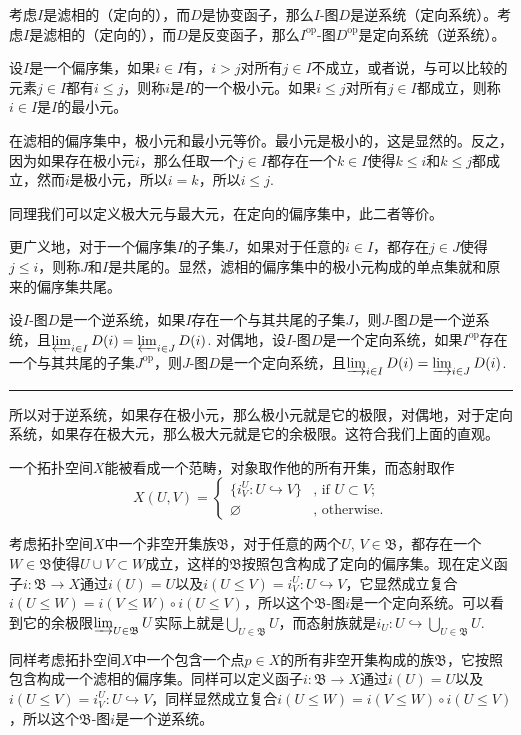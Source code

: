 \para 考虑$I$是滤相的（定向的），而$D$是协变函子，那么$I$-图$D$是逆系统（定向系统）。考虑$I$是滤相的（定向的），而$D$是反变函子，那么$I^{\mathrm{op}}$-图$D^{\mathrm{op}}$是定向系统（逆系统）。

\para 设$I$是一个偏序集，如果$i\in I$有，$i>j$对所有$j\in I$不成立，或者说，与可以比较的元素$j\in I$都有$i\leq j$，则称$i$是$I$的一个极小元。如果$i\leq j$对所有$j\in I$都成立，则称$i\in I$是$I$的最小元。

在滤相的偏序集中，极小元和最小元等价。最小元是极小的，这是显然的。反之，因为如果存在极小元$i$，那么任取一个$j\in I$都存在一个$k\in I$使得$k\leq i$和$k\leq j$都成立，然而$i$是极小元，所以$i=k$，所以$i\leq j$.

同理我们可以定义极大元与最大元，在定向的偏序集中，此二者等价。

更广义地，对于一个偏序集$I$的子集$J$，如果对于任意的$i\in I$，都存在$j\in J$使得$j\leq i$，则称$J$和$I$是共尾的。显然，滤相的偏序集中的极小元构成的单点集就和原来的偏序集共尾。

\pro 设$I$-图$D$是一个逆系统，如果$I$存在一个与其共尾的子集$J$，则$J$-图$D$是一个逆系统，且$\varprojlim_{i\in I} D(i)=\varprojlim_{i\in J} D(i)$. 对偶地，设$I$-图$D$是一个定向系统，如果$I^{\mathrm{op}} $存在一个与其共尾的子集$J^{\mathrm{op}} $，则$J$-图$D$是一个定向系统，且$\varinjlim_{i\in I} D(i)=\varinjlim_{i\in J} D(i)$. \rule{2mm}{2mm}

所以对于逆系统，如果存在极小元，那么极小元就是它的极限，对偶地，对于定向系统，如果存在极大元，那么极大元就是它的余极限。这符合我们上面的直观。

\para 一个拓扑空间$X$能被看成一个范畴，对象取作他的所有开集，而态射取作
\[
	{X}(U,V)=\begin{cases}
	\bigl\{i^U_V:U\hookrightarrow V\bigr\}&\text{, if }U\subset V\text{;}\\
	\varnothing&\text{, otherwise}.
	\end{cases}
\]

考虑拓扑空间$X$中一个非空开集族$\mathfrak{B}$，对于任意的两个$U$, $V\in \mathfrak{B}$，都存在一个$W\in \mathfrak{B}$使得$U\cup V\subset W$成立，这样的$\mathfrak{B}$按照包含构成了定向的偏序集。现在定义函子$i:\mathfrak{B}\to X$通过$i(U)=U$以及$i(U\leq V)=i^U_V:U\hookrightarrow V$，它显然成立复合$i(U\leq W)=i(V\leq W)\circ i(U\leq V)$，所以这个$\mathfrak{B}$-图$i$是一个定向系统。可以看到它的余极限$\varinjlim_{U\in \mathfrak{B}} U$实际上就是$\bigcup_{U\in \mathfrak{B}} U$，而态射族就是$i_U:U\hookrightarrow \bigcup_{U\in \mathfrak{B}} U$.

同样考虑拓扑空间$X$中一个包含一个点$p\in X$的所有非空开集构成的族$\mathfrak{B}$，它按照包含构成一个滤相的偏序集。同样可以定义函子$i:\mathfrak{B}\to X$通过$i(U)=U$以及$i(U\leq V)=i^U_V:U\hookrightarrow V$，同样显然成立复合$i(U\leq W)=i(V\leq W)\circ i(U\leq V)$，所以这个$\mathfrak{B}$-图$i$是一个逆系统。

